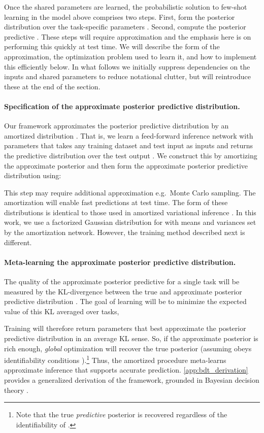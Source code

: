 \documentclass{article}
\begin{document}
Once the shared parameters are learned, the probabilistic solution to few-shot learning in the model above comprises two steps. First, form the posterior distribution over the task-specific parameters . Second, compute the posterior predictive . These steps will require approximation and the emphasis here is on performing this quickly at test time. We will describe the form of the approximation, the optimization problem used to learn it, and how to implement this efficiently below. In what follows we initially suppress dependencies on the inputs  and shared parameters  to reduce notational clutter, but will reintroduce these at the end of the section.

\paragraph{Specification of the approximate posterior predictive distribution.} Our framework approximates the posterior predictive distribution by an amortized distribution . That is, we learn a feed-forward inference network with parameters  that takes any training dataset  and test input  as inputs and returns the predictive distribution over the test output . We construct this by amortizing the approximate posterior  and then form the approximate posterior predictive distribution using:

This step may require additional approximation e.g.~Monte Carlo sampling. The amortization will enable fast predictions at test time. The form of these distributions is identical to those used in amortized variational inference \citep{edwards2016towards,kingma2013auto}. In this work, we use a factorized Gaussian distribution for  with means and variances set by the amortization network. However, the training method described next is different. 

\paragraph{Meta-learning the approximate posterior predictive distribution.} 
The quality of the approximate posterior predictive for a single task will be measured by the KL-divergence between the true and approximate posterior predictive distribution . The goal of learning will be to minimize the expected value of this KL averaged over tasks, 

Training will therefore return parameters  that best approximate the posterior predictive distribution in an average KL sense. So, if the approximate posterior  is rich enough, \textit{global} optimization will recover the true posterior  (assuming  obeys identifiability conditions \citep{casella2002statistical}).\footnote{Note that the true \textit{predictive} posterior  is recovered regardless of the identifiability of .} Thus, the amortized procedure meta-learns approximate inference that supports accurate prediction. \cref{app:bdt_derivation} provides a generalized derivation of the framework, grounded in Bayesian decision theory \citep{jaynes2003probability}.
 
\end{document}

